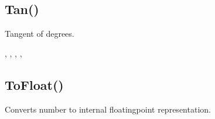 \documentclass[letterpaper,10pt,english]{sphinxmanual}
\begin{document}
\sphinxAtStartPar
{}

\begin{sphinxVerbatim}[commandchars=\\\{\}]
\end{sphinxVerbatim}


\subsection{Tan()}
\label{\detokenize{reference/peblmath:tan}}
\sphinxAtStartPar
{}

\sphinxAtStartPar
Tangent of  degrees.

\sphinxAtStartPar
{}

\begin{sphinxVerbatim}[commandchars=\\\{\}]
\end{sphinxVerbatim}

\sphinxAtStartPar
{}

\begin{sphinxVerbatim}[commandchars=\\\{\}]
\end{sphinxVerbatim}

\sphinxAtStartPar
{}

\sphinxAtStartPar
{}, , , , 


\subsection{ToFloat()}
\label{\detokenize{reference/peblmath:tofloat}}
\sphinxAtStartPar
{}

\sphinxAtStartPar
{}

\sphinxAtStartPar
Converts number to internal floating\sphinxhyphen{}point representation.

\sphinxAtStartPar
{}
\end{document}
